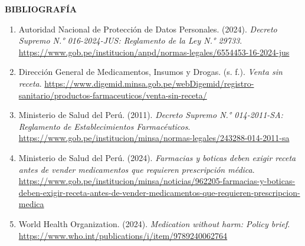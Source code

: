 \documentclass[11pt,a4paper]{article}
\newcommand{\capitulo}[1]{\vspace{1.2em}\noindent\textbf{\large #1}\par\vspace{0.45em}}
\begin{document}
\capitulo{BIBLIOGRAFÍA}

\begin{enumerate}[leftmargin=1.6em,itemsep=0.55em]
    \item Autoridad Nacional de Protección de Datos Personales. (2024). \textit{Decreto Supremo N.° 016-2024-JUS: Reglamento de la Ley N.° 29733}. \url{https://www.gob.pe/institucion/anpd/normas-legales/6554453-16-2024-jus}
    \item Dirección General de Medicamentos, Insumos y Drogas. (s. f.). \textit{Venta sin receta}. \url{https://www.digemid.minsa.gob.pe/webDigemid/registro-sanitario/productos-farmaceuticos/venta-sin-receta/}
    \item Ministerio de Salud del Perú. (2011). \textit{Decreto Supremo N.° 014-2011-SA: Reglamento de Establecimientos Farmacéuticos}. \url{https://www.gob.pe/institucion/minsa/normas-legales/243288-014-2011-sa}
    \item Ministerio de Salud del Perú. (2024). \textit{Farmacias y boticas deben exigir receta antes de vender medicamentos que requieren prescripción médica}. \url{https://www.gob.pe/institucion/minsa/noticias/962205-farmacias-y-boticas-deben-exigir-receta-antes-de-vender-medicamentos-que-requieren-prescripcion-medica}
    \item World Health Organization. (2024). \textit{Medication without harm: Policy brief}. \url{https://www.who.int/publications/i/item/9789240062764}
\end{enumerate}
\end{document}

